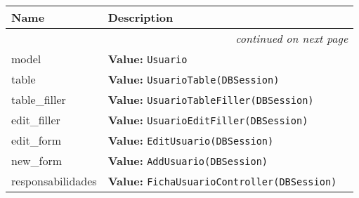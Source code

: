     \vspace{-1cm}
\hspace{\varindent}\begin{longtable}{|p{\varnamewidth}|p{\vardescrwidth}|l}
\cline{1-2}
\cline{1-2} \centering \textbf{Name} & \centering \textbf{Description}& \\
\cline{1-2}
\endhead\cline{1-2}\multicolumn{3}{r}{\small\textit{continued on next page}}\\\endfoot\cline{1-2}
\endlastfoot\raggedright m\-o\-d\-e\-l\- & \raggedright \textbf{Value:} 
{\tt Usuario}&\\
\cline{1-2}
\raggedright t\-a\-b\-l\-e\- & \raggedright \textbf{Value:} 
{\tt UsuarioTable(DBSession)}&\\
\cline{1-2}
\raggedright t\-a\-b\-l\-e\-\_\-f\-i\-l\-l\-e\-r\- & \raggedright \textbf{Value:} 
{\tt UsuarioTableFiller(DBSession)}&\\
\cline{1-2}
\raggedright e\-d\-i\-t\-\_\-f\-i\-l\-l\-e\-r\- & \raggedright \textbf{Value:} 
{\tt UsuarioEditFiller(DBSession)}&\\
\cline{1-2}
\raggedright e\-d\-i\-t\-\_\-f\-o\-r\-m\- & \raggedright \textbf{Value:} 
{\tt EditUsuario(DBSession)}&\\
\cline{1-2}
\raggedright n\-e\-w\-\_\-f\-o\-r\-m\- & \raggedright \textbf{Value:} 
{\tt AddUsuario(DBSession)}&\\
\cline{1-2}
\raggedright r\-e\-s\-p\-o\-n\-s\-a\-b\-i\-l\-i\-d\-a\-d\-e\-s\- & \raggedright \textbf{Value:} 
{\tt FichaUsuarioController(DBSession)}&\\
\cline{1-2}
\end{longtable}


